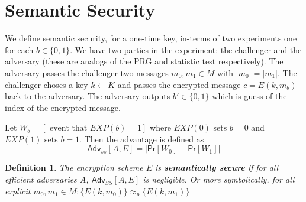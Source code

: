 \documentclass[twoside]{article}
\newtheorem{definition}[theorem]{Definition}
\def\Pr{\mathsf{Pr}}
\def\Adv{\mathsf{Adv}}
\begin{document}
\section{Semantic Security}
We define semantic security, for a one-time key, in-terms of two experiments one for each $b \in \{0,1\}$. We have two parties in the experiment: the challenger and the adversary (these are analogs of the PRG and statistic test respectively). The adversary passes the challenger two messages $m_0, m_1 \in M$ with $|m_0| = |m_1|$. The challenger choses a key $k \leftarrow K$ and passes the encrypted message $c = E(k, m_b)$ back to the adversary. The adversary outputs $b' \in \{0,1\}$ which is guess of the index of the encrypted message. 

Let $W_b = [\mbox{ event that } EXP(b) = 1]$ where $EXP(0)$ sets $b = 0$ and $EXP(1)$ sets $b = 1$. Then the advantage is defined as
\[\Adv_{ss}[A, E] = \left| \Pr[W_0] - \Pr[W_1] \right|\]

\begin{definition}
The encryption scheme $E$ is \textbf{semantically secure} if for all efficient adversaries $A$, $\Adv_{SS}[A, E]$ is negligible. Or more symbolically, for all explicit $m_0, m_1 \in M: \{E(k, m_0)\} \approx_p \{E(k, m_1)\}$
\end{definition}
\end{document}
